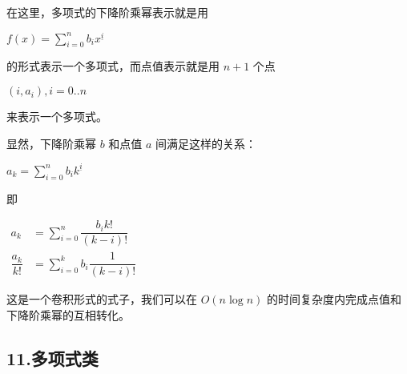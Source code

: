 \documentclass[]{article}
\begin{document}
在这里，多项式的下降阶乘幂表示就是用

\(f(x)=\sum\limits_{i=0}^nb_i{x^{\underline{i}}}\)

的形式表示一个多项式，而点值表示就是用 \(n+1\) 个点

\((i,a_i),i=0..n\)

来表示一个多项式。

显然，下降阶乘幂 \(b\) 和点值 \(a\) 间满足这样的关系：

\(a_k=\sum\limits_{i=0}^{n}b_ik^{\underline{i}}\)

即

\(\begin{aligned} a_k&=\sum\limits_{i=0}^{n}\dfrac{b_ik!}{(k-i)!}\\\dfrac{a_k}{k!}&=\sum\limits_{i=0}^kb_i\dfrac{1}{(k-i)!} \end{aligned}\)

这是一个卷积形式的式子，我们可以在 \(O(n\log n)\)
的时间复杂度内完成点值和下降阶乘幂的互相转化。

\hypertarget{ux591aux9879ux5f0fux7c7b}{%
\subsection{11.多项式类}\label{ux591aux9879ux5f0fux7c7b}}
\end{document}
